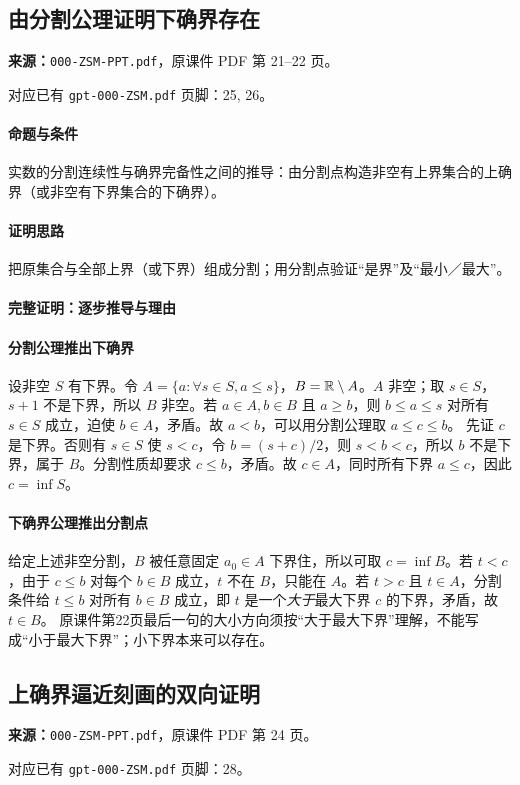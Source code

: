 \clearpage\subsection{由分割公理证明下确界存在}
\textbf{来源：}\texttt{000-ZSM-PPT.pdf}，原课件 PDF 第 21--22 页。\par
对应已有 \texttt{gpt-000-ZSM.pdf} 页脚：25, 26。\par
\paragraph{命题与条件}实数的分割连续性与确界完备性之间的推导：由分割点构造非空有上界集合的上确界（或非空有下界集合的下确界）。
\paragraph{证明思路}把原集合与全部上界（或下界）组成分割；用分割点验证“是界”及“最小／最大”。
\paragraph{完整证明：逐步推导与理由}

\paragraph{分割公理推出下确界}
设非空 $S$ 有下界。令 $A=\{a:\forall s\in S,a\le s\}$，$B=\mathbb{R}\setminus A$。$A$ 非空；取 $s\in S$，$s+1$ 不是下界，所以 $B$ 非空。若 $a\in A,b\in B$ 且 $a\ge b$，则 $b\le a\le s$ 对所有 $s\in S$ 成立，迫使 $b\in A$，矛盾。故 $a<b$，可以用分割公理取 $a\le c\le b$。
先证 $c$ 是下界。否则有 $s\in S$ 使 $s<c$，令 $b=(s+c)/2$，则 $s<b<c$，所以 $b$ 不是下界，属于 $B$。分割性质却要求 $c\le b$，矛盾。故 $c\in A$，同时所有下界 $a\le c$，因此 $c=\inf S$。
\paragraph{下确界公理推出分割点}
给定上述非空分割，$B$ 被任意固定 $a_0\in A$ 下界住，所以可取 $c=\inf B$。若 $t<c$，由于 $c\le b$ 对每个 $b\in B$ 成立，$t$ 不在 $B$，只能在 $A$。若 $t>c$ 且 $t\in A$，分割条件给 $t\le b$ 对所有 $b\in B$ 成立，即 $t$ 是一个\emph{大于}最大下界 $c$ 的下界，矛盾，故 $t\in B$。
原课件第22页最后一句的大小方向须按“大于最大下界”理解，不能写成“小于最大下界”；小下界本来可以存在。

\clearpage\subsection{上确界逼近刻画的双向证明}
\textbf{来源：}\texttt{000-ZSM-PPT.pdf}，原课件 PDF 第 24 页。\par
对应已有 \texttt{gpt-000-ZSM.pdf} 页脚：28。\par
